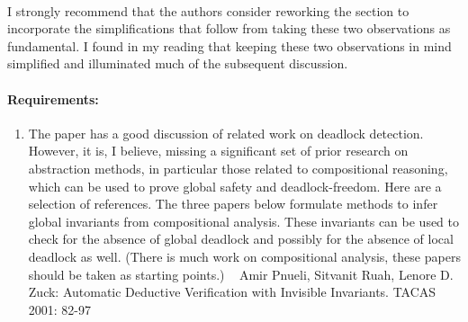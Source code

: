 \begin{enumerate}
~

I strongly recommend that the authors consider reworking the section to incorporate the simplifications that follow from taking these two observations as fundamental. I found in my reading that keeping these two observations in mind simplified and illuminated much of the subsequent discussion.

\end{enumerate}

\paragraph{Requirements:}
\begin{enumerate}
\item The paper has a good discussion of related work on deadlock detection.
 However, it is, I believe, missing a significant set of prior research on 
 abstraction methods, in particular those related to compositional 
 reasoning, which can be used to prove global safety and deadlock-freedom. 
 Here are a selection of references. The three papers below formulate 
 methods to infer global invariants from compositional analysis. 
 These invariants can be used to check for the absence of global deadlock 
 and possibly for the absence of local deadlock as well. 
 (There is much work on compositional analysis, these papers should be 
 taken as starting points.)
~
Amir Pnueli, Sitvanit Ruah, Lenore D. Zuck:
Automatic Deductive Verification with Invisible Invariants. TACAS 2001: 82-97



\end{enumerate}

